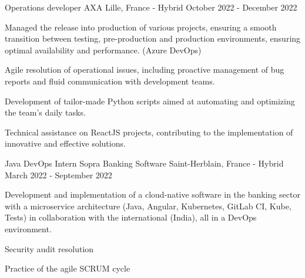 \begin{cventries}
  \cventry
    {Operations developer} %
    {AXA} %
    {Lille, France - Hybrid} %
    {October 2022 - December 2022} %
    {
      \begin{cvitems} %
        \item {Managed the release into production of various projects, ensuring a smooth transition between testing, pre-production and production environments, ensuring optimal availability and performance. (Azure DevOps)}
        \item {Agile resolution of operational issues, including proactive management of bug reports and fluid communication with development teams.}
        \item {Development of tailor-made Python scripts aimed at automating and optimizing the team's daily tasks.}
        \item {Technical assistance on ReactJS projects, contributing to the implementation of innovative and effective solutions.}
      \end{cvitems}
    }

  \cventry
    {Java DevOps Intern} %
    {Sopra Banking Software} %
    {Saint-Herblain, France - Hybrid} %
    {March 2022 - September 2022} %
    {
      \begin{cvitems} %
        \item {Development and implementation of a cloud-native software in the banking sector with a microservice architecture (Java, Angular, Kubernetes, GitLab CI, Kube, Tests) in collaboration with the international (India), all in a DevOps environment.}
        \item {Security audit resolution}
        \item {Practice of the agile SCRUM cycle}
      \end{cvitems}
    }
    


\end{cventries}
